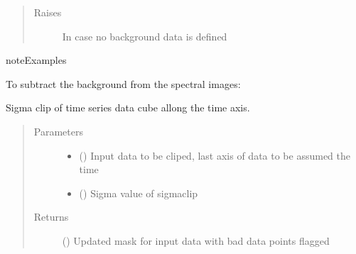 \documentclass[a4paper,10pt,english]{sphinxmanual}
\begin{document}
\begin{fulllineitems}
\begin{fulllineitems}
\begin{quote}
\begin{description}
\item[{Raises}] \leavevmode
{} \textendash{} In case no background data is defined

\end{description}\end{quote}

\begin{sphinxadmonition}{note}{Examples}

To subtract the background from the spectral images:

%
\begin{sphinxVerbatim}[commandchars=\\\{\}]
\end{sphinxVerbatim}
\end{sphinxadmonition}

\end{fulllineitems}


\begin{fulllineitems}
\label{\detokenize{cascade.TSO:cascade.TSO.TSO.TSOSuite.sigma_clip_data_cosmic}}
Sigma clip of time series data cube allong the time axis.
\begin{quote}\begin{description}
\item[{Parameters}] \leavevmode\begin{itemize}
\item {} 
 () \textendash{} Input data to be cliped, last axis of data to be assumed the time

\item {} 
 () \textendash{} Sigma value of sigmaclip

\end{itemize}

\item[{Returns}] \leavevmode
{} () \textendash{} Updated mask for input data with bad data points flagged 


\end{description}
\end{quote}
\end{fulllineitems}
\end{fulllineitems}
\end{document}
